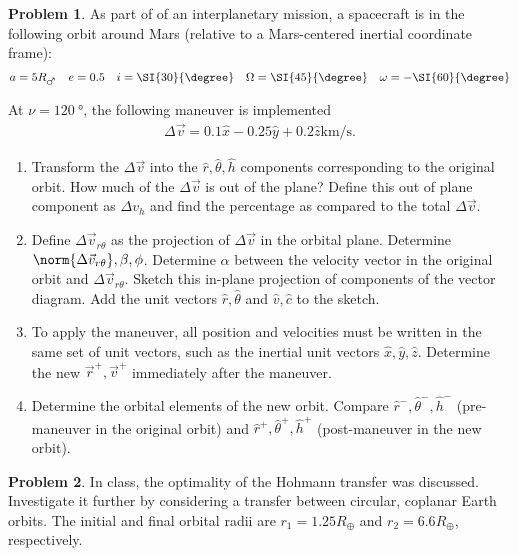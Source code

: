 \documentclass[10pt]{article}
\theoremstyle{definition}
\newtheorem{prob}{Problem}[section]
\newenvironment{subprob}%
{\renewcommand{\theenumi}{\alph{enumi}}\renewcommand{\labelenumi}{(\theenumi)}\begin{enumerate}}%
{\end{enumerate}}%
\begin{document}
\begin{prob}
    As part of of an interplanetary mission, a spacecraft is in the following orbit around Mars (relative to a Mars-centered inertial coordinate frame):
    \begin{align*}
        a = 5 R_{\mars} \quad e = 0.5 \quad i = \SI{30}{\degree} \quad \Omega = \SI{45}{\degree} \quad \omega = - \SI{60}{\degree}
    \end{align*}

    At \( \nu = \SI{120}{\degree} \), the following maneuver is implemented
    \begin{align*}
        \Delta \vec v = 0.1 \hat x - 0.25 \hat y + 0.2 \hat z \si{\kilo\meter\per\second}.
    \end{align*}

    \begin{subprob}
    \item Transform the \( \Delta \vec v\) into the \( \hat r, \hat \theta, \hat h\) components corresponding to the original orbit.
        How much of the \( \Delta \vec v \) is out of the plane?
        Define this out of plane component as \( \Delta v_h \) and find the percentage as compared to the total \( \Delta \vec v \).
    \item Define \( \Delta \vec v_{r\theta} \) as the projection of \( \Delta \vec v \) in the orbital plane. 
        Determine \( \norm{\Delta \vec v_{r\theta}}, \beta, \phi \).
        Determine  \( \alpha \)  between the velocity vector in the original orbit and \( \Delta \vec v_{r\theta}\).
        Sketch this in-plane projection of components of the vector diagram.
        Add the unit vectors \( \hat r, \hat \theta\) and \( \hat v, \hat c \) to the sketch.
    \item To apply the maneuver, all position and velocities must be written in the same set of unit vectors, such as the inertial unit vectors \( \hat x, \hat y, \hat z \).
        Determine the new \( \vec r^{+}, \vec v^{+} \) immediately after the maneuver.
    \item Determine the orbital elements of the new orbit.
        Compare \( \hat r^- , \hat \theta^-, \hat h ^-\) (pre-maneuver in the original orbit) and \( \hat r^+, \hat \theta^+, \hat h^+\) (post-maneuver in the new orbit).
    \end{subprob}
\end{prob}

\begin{prob}
    In class, the optimality of the Hohmann transfer was discussed.
    Investigate it further by considering a  transfer between circular, coplanar Earth orbits.
    The initial and final orbital radii are \( r_1 = 1.25 R_{\oplus} \) and \( r_2 = 6.6 R_{\oplus} \), respectively.
\end{prob}
\end{document}
